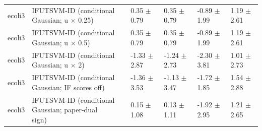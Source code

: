 \begin{table}[!t]
{\begin{tabular}{llllll}
ecoli3 & \shortstack[l]{IFUTSVM-ID (conditional\\Gaussian; u \(\times\) 0.25)} & 0.35 \(\pm\) 0.79 & 0.35 \(\pm\) 0.79 & -0.89 \(\pm\) 1.99 & 1.19 \(\pm\) 2.61 \\
ecoli3 & \shortstack[l]{IFUTSVM-ID (conditional\\Gaussian; u \(\times\) 0.5)} & 0.35 \(\pm\) 0.79 & 0.35 \(\pm\) 0.79 & -0.89 \(\pm\) 1.99 & 1.19 \(\pm\) 2.61 \\
ecoli3 & \shortstack[l]{IFUTSVM-ID (conditional\\Gaussian; u \(\times\) 2)} & -1.33 \(\pm\) 2.87 & -1.24 \(\pm\) 2.73 & -2.30 \(\pm\) 3.81 & 1.01 \(\pm\) 2.73 \\
ecoli3 & \shortstack[l]{IFUTSVM-ID (conditional\\Gaussian; IF scores off)} & -1.36 \(\pm\) 3.53 & -1.13 \(\pm\) 3.47 & -1.72 \(\pm\) 1.85 & 1.54 \(\pm\) 2.88 \\
ecoli3 & \shortstack[l]{IFUTSVM-ID (conditional\\Gaussian; paper-dual\\sign)} & 0.15 \(\pm\) 1.08 & 0.13 \(\pm\) 1.11 & -1.92 \(\pm\) 2.95 & 1.21 \(\pm\) 2.65 \\
\hline
\end{tabular}%
}
\end{table}

